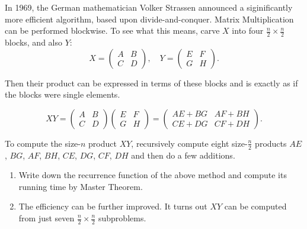 \documentclass[12pt,a4paper]{article}
\makeatletter
\newtheorem*{solution}{Solution}
\theoremstyle{definition}
\renewenvironment{solution}[1][Solution] {\par\pushQED{\qed}\normalfont\topsep6\p@\@plus6\p@\relax\trivlist\item[\hskip\labelsep\bfseries#1\@addpunct{.}]\ignorespaces}{\popQED\endtrivlist\@endpefalse} \makeatother
\makeatother
\begin{document}
\begin{enumerate}
In 1969, the German mathematician Volker Strassen announced a siginificantly more efficient algorithm, based upon divide-and-conquer. Matrix Multiplication can be performed blockwise. To see what this means, carve $X$ into four $\frac{n}{2} \times \frac{n}{2}$ blocks, and also $Y$:
\begin{displaymath}
X=
\left(\begin{array}{c|c}
A & B \\
\hline
C & D \end{array}\right), \quad
Y=\left(\begin{array}{c|c}
E & F \\
\hline
G & H \end{array}\right).
 \end{displaymath}

Then their product can be expressed in terms of these blocks and is exactly as if the blocks were single elements.

 \begin{displaymath}
 XY=
\left(\begin{array}{c|c}
A & B \\
\hline
C & D \end{array}\right)
\left(\begin{array}{c|c}
E & F \\
\hline
G & H \end{array}\right)
=
\left(\begin{array}{c|c}
AE+BG & AF+BH \\
\hline
CE+DG & CF+DH \end{array}\right).
 \end{displaymath}

To compute the size-$n$ product $XY$, recursively compute eight size-$\frac{n}{2}$ products $AE$,  $BG$, $AF$, $BH$, $CE$, $DG$, $CF$, $DH$ and then do a few additions.

\begin{enumerate}
\item Write down the recurrence function of the above method and compute its running time by Master Theorem.


\item The efficiency can be further improved. It turns out $XY$ can be computed from just seven $\frac{n}{2}\times \frac{n}{2}$ subproblems.


\end{enumerate}
\end{enumerate}
\end{document}
